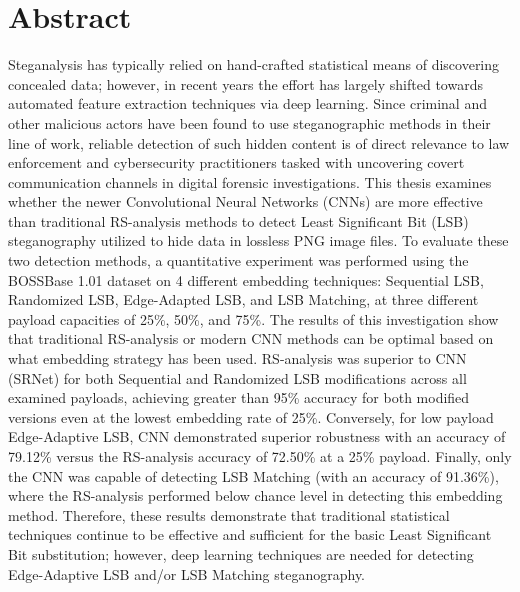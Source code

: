 \chapter*{Abstract} 
\pagestyle{plain}
 
Steganalysis has typically relied on hand-crafted statistical means of discovering concealed data; 
however, in recent years the effort has largely shifted towards automated feature extraction techniques 
via deep learning. 
Since criminal and other malicious actors have been found to use steganographic methods in their line of work, 
reliable detection of such hidden content is of direct relevance to law enforcement 
and cybersecurity practitioners tasked with uncovering covert communication channels in digital forensic 
investigations. 
This thesis examines whether the newer Convolutional Neural Networks (CNNs) are more 
effective than traditional RS-analysis methods to detect Least Significant Bit (LSB) steganography 
utilized to hide data in lossless PNG image files. 
To evaluate these two detection methods, a quantitative experiment was performed using the BOSSBase 1.01 
dataset on 4 different embedding techniques: Sequential LSB, Randomized LSB, Edge-Adapted LSB, 
and LSB Matching, at three different 
payload capacities of 25\%, 50\%, and 75\%. 
The results of this investigation show that traditional RS-analysis 
or modern CNN methods can be optimal based on what embedding strategy has been used. 
RS-analysis was superior to CNN (SRNet) for both Sequential and Randomized LSB modifications across 
all examined payloads, achieving greater than 95\% accuracy for both modified versions even at the 
lowest embedding rate of 25\%. 
Conversely, for low payload Edge-Adaptive LSB, CNN demonstrated superior robustness with an 
accuracy of 79.12\% versus the RS-analysis accuracy of 72.50\% at a 25\% payload. 
Finally, only the CNN was capable of detecting LSB Matching (with an accuracy of 91.36\%), 
where the RS-analysis performed below chance level in detecting this embedding method. 
Therefore, these results demonstrate that traditional statistical techniques continue to be 
effective and sufficient for the basic Least Significant Bit substitution; however, deep 
learning techniques are needed for detecting Edge-Adaptive LSB and/or LSB Matching steganography.
